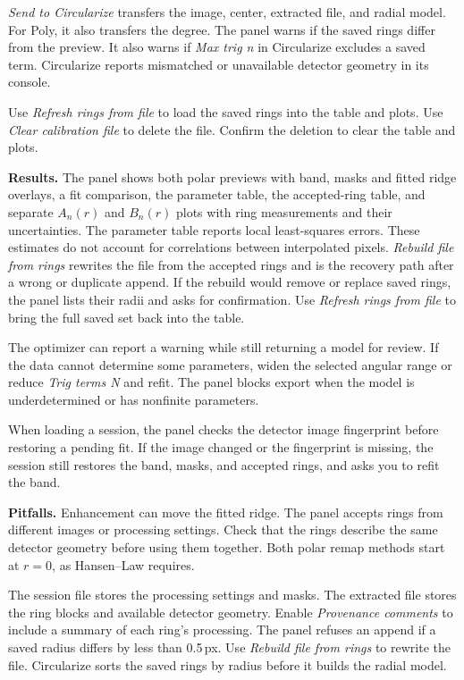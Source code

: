 \documentclass[11pt,a4paper]{article}
\begin{document}
\emph{Send to Circularize} transfers the image, center, extracted file,
and radial model. For Poly, it also transfers the degree.
The panel warns if the saved rings differ from the preview.
It also warns if \emph{Max trig n} in Circularize excludes a saved term.
Circularize reports mismatched or unavailable detector geometry in its console.

Use \emph{Refresh rings from file} to load the saved rings into the table
and plots. Use \emph{Clear calibration file} to delete the file.
Confirm the deletion to clear the table and plots.

\textbf{Results.} The panel shows both polar previews with band, masks and fitted
ridge overlays, a fit comparison, the parameter table, the accepted-ring
table, and separate $A_n(r)$ and $B_n(r)$ plots with ring measurements and
their uncertainties. The parameter table reports local
least-squares errors. These estimates do not account for correlations between
interpolated pixels. \emph{Rebuild file from
rings} rewrites the file from the accepted rings and is the recovery path after
a wrong or duplicate append. If the rebuild would remove or replace saved
rings, the panel lists their radii and asks for confirmation. Use
\emph{Refresh rings from file} to bring the full saved set back into the table.

The optimizer can report a warning while still returning a model for review.
If the data cannot determine some parameters, widen the selected angular
range or reduce \emph{Trig terms N} and refit. The panel blocks export when
the model is underdetermined or has nonfinite parameters.

When loading a session, the panel checks the detector image fingerprint
before restoring a pending fit. If the image changed or the fingerprint is
missing, the session still restores the band, masks, and accepted rings, and
asks you to refit the band.

\textbf{Pitfalls.} Enhancement can move the fitted ridge. The panel accepts
rings from different images or processing settings. Check that the rings
describe the same detector geometry before using them together.
Both polar remap methods start at $r=0$, as Hansen--Law requires.

The session file stores the processing settings and masks. The extracted
file stores the ring blocks and available detector geometry. Enable
\emph{Provenance comments} to include a summary of each ring's processing.
The panel refuses an append if a saved radius differs by less than 0.5\,px.
Use \emph{Rebuild file from rings} to rewrite the file.
Circularize sorts the saved rings by radius before it builds the radial model.
\end{document}
